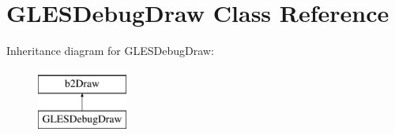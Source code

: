 \hypertarget{class_g_l_e_s_debug_draw}{\section{G\-L\-E\-S\-Debug\-Draw Class Reference}
\label{d7/da9/class_g_l_e_s_debug_draw}
}
Inheritance diagram for G\-L\-E\-S\-Debug\-Draw\-:\begin{figure}[H]
\begin{center}
\leavevmode
\includegraphics[height=2.000000cm]{d7/da9/class_g_l_e_s_debug_draw}
\end{center}
\end{figure}
